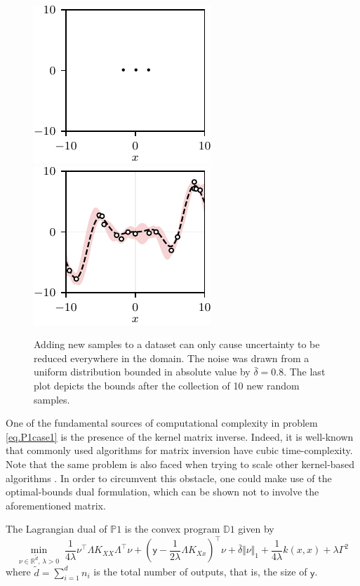 \begin{figure}[h]
	\includegraphics{../images/chap2_ex3_dots.pdf} 
	\includegraphics{../images/chap2_ex3_opt_bounds_H.pdf} 
	\caption{Adding new samples to a dataset can only cause uncertainty to be reduced everywhere in the domain. The noise was drawn from a uniform distribution bounded in absolute value by $\bar\delta=0.8$. The last plot depicts the bounds after the collection of 10 new random samples.}
	\label{fig.ex3_adding_samples}
\end{figure}

\FloatBarrier

One of the fundamental sources of computational complexity in problem \eqref{eq.P1case1} is the presence of the kernel matrix inverse. Indeed, it is well-known that commonly used algorithms for matrix inversion have cubic time-complexity. Note that the same problem is also faced when trying to scale other kernel-based algorithms  \citep{zhang2013divide,bauer2016understanding,lederer2021gaussian}. In order to circumvent this obstacle, one could make use of the optimal-bounds dual formulation, which can be shown not to involve the aforementioned matrix.

\begin{proposition}
	\label{prop.dual_problem}
	The Lagrangian dual of $\mathds{P}1$ is the convex program $\mathds{D}1$ given by
	\begin{equation}
			\min_{\nu \in \mathbb{R}^{\tilde d}, \, \lambda > 0} \; \frac{1}{4\lambda} \nu^\top \Lambda K_{XX} \Lambda^\top \nu + \left(\mathsf{y} - \frac{1}{2\lambda} \Lambda K_{Xx} \right)^\top \nu + \bar \delta \Vert \nu \Vert_1 +  \frac{1}{4\lambda} k(x,x) + \lambda \Gamma^2    
		\label{eq.dualProb}
	\end{equation}
	where $\tilde d = \sum_{i=1}^d n_i$ is the total number of outputs, that is, the size of $\mathsf{y}$.
\end{proposition}

